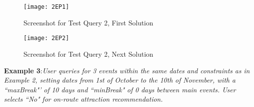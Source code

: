 \begin{figure}
\begin{center}
\texttt{[image: 2EP1]}
\caption {Screenshot for Test Query 2, First Solution}
\label{fig:Fig6.3}
\end{center}
\end{figure}

\begin{figure}
\begin{center}
\texttt{[image: 2EP2]}
\caption {Screenshot for Test Query 2, Next Solution}
\label{fig:Fig6.3}
\end{center}
\end{figure}




\hspace{0.3in}\textbf{Example 3}:\emph{User queries for 3 events within the same dates and constraints as in Example 2,
setting dates from 1st of October to the 10th of November, with a ``maxBreak"' of 10 days and ``minBreak" of 0 days between main events. User selects ``No" for on-route attraction recommendation.}\\

